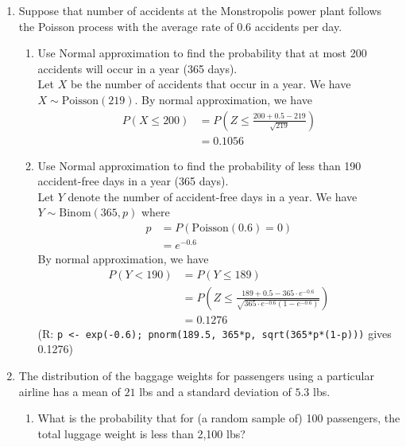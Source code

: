 \documentclass[12pt]{article} %
\newcommand{\Red}{\color{Red}}
\begin{document}
\thispagestyle{firstpage}


\begin{enumerate}
\item Suppose that number of accidents at the Monstropolis power plant follows the Poisson process with the average rate of 0.6 accidents per day. 
\begin{enumerate}[label=1.\arabic*]
\item Use Normal approximation to find the probability that at most 200 accidents will occur in a year (365 days). \\ {\Red Let $X$ be the number of accidents that occur in a year. We have $X \sim \text{Poisson}(219)$. By normal approximation, we have $$\begin{aligned}
    P(X \leq 200) &= P\left( Z \leq \frac{200+0.5-219}{\sqrt{219}} \right) \\
    &= 0.1056
\end{aligned}$$}
\item Use Normal approximation to find the probability of less than 190 accident-free days in a year (365 days). \\ {\Red Let $Y$ denote the number of accident-free days in a year. We have $Y \sim \text{Binom}(365, p)$ where $$\begin{aligned}
    p &= P(\text{Poisson}(0.6) = 0) \\
    &= e^{-0.6}
\end{aligned}$$ By normal approximation, we have $$\begin{aligned}
    P(Y < 190) &= P(Y \leq 189) \\
    &= P\left(Z \leq \frac{189+0.5-365 \cdot e^{-0.6}}{\sqrt{365 \cdot e^{-0.6}(1-e^{-0.6})}}\right) \\
    &= 0.1276
    \end{aligned}$$}
    (R: \texttt{p <- exp(-0.6); pnorm(189.5, 365*p, sqrt(365*p*(1-p)))} gives 0.1276)
\end{enumerate}
\newpage
\item The distribution of the baggage weights for passengers using a particular airline has a mean of $21$ lbs and a standard deviation of $5.3$ lbs. 
\begin{enumerate}[label=2.\arabic*]
\item What is the probability that for (a random sample of) 100 passengers, the total luggage weight is less than 2,100 lbs? \\ {\Red $$\begin{aligned}

\end{aligned}$$}
\end{enumerate}
\end{enumerate}
\end{document}
